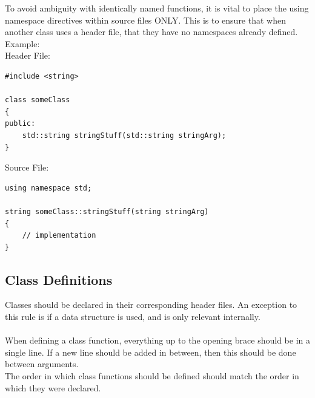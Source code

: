 \documentclass[12pt,article]{memoir}
\begin{document}
\noindent
To avoid ambiguity with identically named functions, it is vital to place the using namespace directives within source files ONLY. This is to ensure that when another class uses a header file, that they have no namespaces already defined.\\

\noindent
Example:\\
Header File:
\begin{lstlisting}
#include <string>

class someClass
{
public:
	std::string stringStuff(std::string stringArg);
}
\end{lstlisting}

\noindent
Source File:
\begin{lstlisting}
using namespace std;

string someClass::stringStuff(string stringArg)
{
	// implementation
}
\end{lstlisting}

\newpage
\subsection{Class Definitions}
Classes should be declared in their corresponding header files. An exception to this rule is if a data structure is used, and is only relevant internally.\\\\

\noindent
When defining a class function, everything up to the opening brace should be in a single line. If a new line should be added in between, then this should be done between arguments.\\

\noindent
The order in which class functions should be defined should match the order in which they were declared.\\



\end{document}

